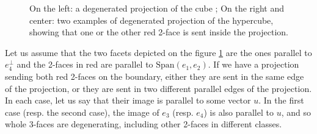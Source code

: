 \documentclass[12pt, notitlepage]{article}
\theoremstyle{plain}
\theoremstyle{definition}
\theoremstyle{plain}
\theoremstyle{remark}
\theoremstyle{plain}
\theoremstyle{plain}
\newcommand{\vect}{\text{Span}}
\begin{document}
\begin{figure}[ht]
\caption{On the left: a degenerated projection of the cube ; On the right and center: two examples of degenerated projection of the hypercube, showing that one or the other red 2-face is sent inside the projection.}
\label{optimality}
\end{figure}

Let us assume that the two facets depicted on the figure \ref{optimality} are the ones parallel to $e_4^\perp$ and the 2-faces in red are parallel to $\vect(e_1,e_2)$. If we have a projection sending both red 2-faces on the boundary, either they are sent in the same edge of the projection, or they are sent in two different parallel edges of the projection. In each case, let us say that their image is parallel to some vector $u$. In the first case (resp. the second case), the image of $e_3$ (resp. $e_4$) is also parallel to $u$, and so whole 3-faces are degenerating, including other 2-faces in different classes.
\end{document}
